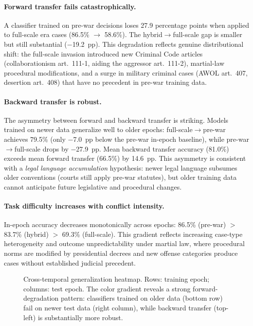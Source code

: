 \documentclass[11pt,a4paper]{article}
\begin{document}
\paragraph{Forward transfer fails catastrophically.}
A classifier trained on pre-war decisions loses 27.9 percentage points when applied to full-scale era cases (86.5\% $\rightarrow$ 58.6\%). The hybrid$\rightarrow$full-scale gap is smaller but still substantial ($-$19.2~pp). This degradation reflects genuine distributional shift: the full-scale invasion introduced new Criminal Code articles (collaborationism art.~111-1, aiding the aggressor art.~111-2), martial-law procedural modifications, and a surge in military criminal cases (AWOL art.~407, desertion art.~408) that have no precedent in pre-war training data.

\paragraph{Backward transfer is robust.}
The asymmetry between forward and backward transfer is striking. Models trained on newer data generalize well to older epochs: full-scale$\rightarrow$pre-war achieves 79.5\% (only $-$7.0~pp below the pre-war in-epoch baseline), while pre-war$\rightarrow$full-scale drops by $-$27.9~pp. Mean backward transfer accuracy (81.0\%) exceeds mean forward transfer (66.5\%) by 14.6~pp. This asymmetry is consistent with a \emph{legal language accumulation} hypothesis: newer legal language subsumes older conventions (courts still apply pre-war statutes), but older training data cannot anticipate future legislative and procedural changes.

\paragraph{Task difficulty increases with conflict intensity.}
In-epoch accuracy decreases monotonically across epochs: 86.5\% (pre-war) $>$ 83.7\% (hybrid) $>$ 69.3\% (full-scale). This gradient reflects increasing case-type heterogeneity and outcome unpredictability under martial law, where procedural norms are modified by presidential decrees and new offense categories produce cases without established judicial precedent.

\begin{figure}[t]
\centering

\caption{Cross-temporal generalization heatmap. Rows: training epoch; columns: test epoch. The color gradient reveals a strong forward-degradation pattern: classifiers trained on older data (bottom row) fail on newer test data (right column), while backward transfer (top-left) is substantially more robust.}
\label{fig:temporal_heatmap}
\end{figure}
\end{document}
